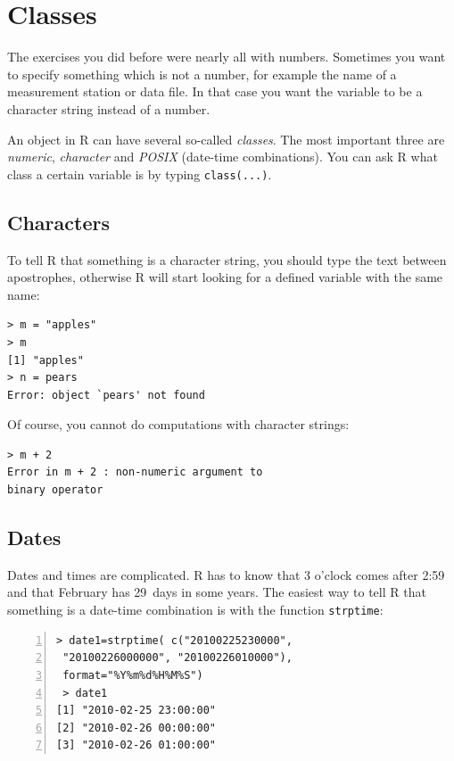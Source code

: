 \documentclass[a4paper,11pt,twocolumn,tablecaptionabove]{scrartcl}
\begin{document}
\section{Classes}

The exercises you did before were nearly all with numbers. Sometimes you want to specify something which is not a number, for example the name of a measurement station or data file. In that case you want the variable to be a character string instead of a number. 

An object in R can have several so-called \emph{classes}. The most important three are
\emph{numeric}, \emph{character} and \emph{POSIX} (date-time combinations). You can ask R what class a certain variable is by typing \texttt{class(...)}. 

\subsection{Characters}
\label{sec:characters}

To tell R that something is a character string, you should type the text between apostrophes, otherwise R will start looking for a defined variable with the same name:

\begin{Verbatim}[frame=single,gobble=0]
> m = "apples"
> m
[1] "apples"
> n = pears
Error: object `pears' not found
\end{Verbatim}

Of course, you cannot do computations with character strings:

\begin{Verbatim}[frame=single,gobble=0]
> m + 2
Error in m + 2 : non-numeric argument to 
binary operator
\end{Verbatim}

\subsection{Dates}

Dates and times are complicated. R has to know that 3 o'clock comes after 2:59 and that February has 29~days in some years. The easiest way to tell R that something is a date-time combination is with the function \texttt{strptime}:

\begin{Verbatim}[frame=single,numbers=left,gobble=0, xleftmargin=0.35cm, numbersep=0.1cm]
> date1=strptime( c("20100225230000", 
 "20100226000000", "20100226010000"), 
 format="%Y%m%d%H%M%S")
 > date1
[1] "2010-02-25 23:00:00" 
[2] "2010-02-26 00:00:00" 
[3] "2010-02-26 01:00:00"
\end{Verbatim}
\end{document}
